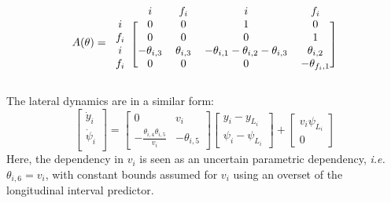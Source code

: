 \documentclass{article}
\begin{document}
\begin{equation*}
A(\theta)
=
\begin{blockarray}{ccccc}
& i & f_i & i & f_i \\
\begin{block}{c[cccc]}
i & 0 & 0 & 1 & 0 \\
f_i & 0 & 0 & 0 & 1 \\
i & -\theta_{i,3} & \theta_{i,3} & -\theta_{i,1}-\theta_{i,2}-\theta_{i,3} & \theta_{i,2} \\
f_i & 0 & 0 & 0 & -\theta_{f_i,1} \\
\end{block}
\end{blockarray}
\end{equation*}

The lateral dynamics are in a similar form:
\begin{equation*}
\begin{bmatrix}
\dot{y}_i \\
\dot{\psi}_i \\
\end{bmatrix}
=
\begin{bmatrix}
0 & v_i \\
-\frac{\theta_{i,4} \theta_{i,5}}{v_i} & -\theta_{i,5}
\end{bmatrix}
\begin{bmatrix}
y_i - y_{L_i} \\
\psi_i - \psi_{L_i}
\end{bmatrix}
+
\begin{bmatrix}
v_i\psi_{L_i} \\
0
\end{bmatrix}
\end{equation*}
Here, the dependency in $v_i$ is seen as an uncertain parametric dependency, \emph{i.e.} $\theta_{i,6}=v_i$, with constant bounds assumed for $v_i$ using an overset of the longitudinal interval predictor.
\end{document}
